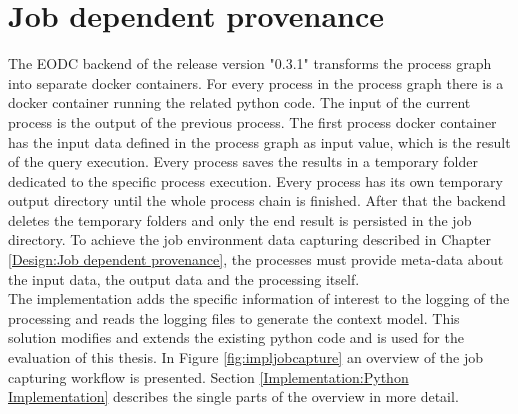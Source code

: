 \documentclass[draft,final]{vutinfth} %
\begin{document}
\section{Job dependent provenance}\label{Implementation:Job dependent provenance}
The EODC backend of the release version "0.3.1" transforms the process graph into separate docker containers. For every process in the process graph there is a docker container running the related python code. The input of the current process is the output of the previous process. The first process docker container has the input data defined in the process graph as input value, which is the result of the query execution. Every process saves the results in a temporary folder dedicated to the specific process execution. Every process has its own temporary output directory until the whole process chain is finished. After that the backend deletes the temporary folders and only the end result is persisted in the job directory.
To achieve the job environment data capturing described in Chapter \ref{Design:Job dependent provenance}, the processes must provide meta-data about the input data, the output data and the processing itself. \\ 
The implementation adds the specific information of interest to the logging of the processing and reads the logging files to generate the context model. This solution modifies and extends the existing python code and is used for the evaluation of this thesis. In Figure \ref{fig:impljobcapture} an overview of the job capturing workflow is presented. Section \ref{Implementation:Python Implementation} describes the single parts of the overview in more detail.  
\end{document}
